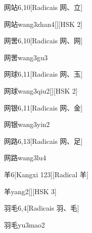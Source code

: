 \begin{entry}{网站}{6,10}[Radicais ⽹、⽴]
  \begin{phonetics}{网站}{wang3zhan4}[][HSK 2]
  \end{phonetics}
\end{entry}

\begin{entry}{网罟}{6,10}[Radicais ⽹、⽹]
  \begin{phonetics}{网罟}{wang3gu3}
  \end{phonetics}
\end{entry}

\begin{entry}{网球}{6,11}[Radicais ⽹、⽟]
  \begin{phonetics}{网球}{wang3qiu2}[][HSK 2]
  \end{phonetics}
\end{entry}

\begin{entry}{网银}{6,11}[Radicais ⽹、⾦]
  \begin{phonetics}{网银}{wang3yin2}
  \end{phonetics}
\end{entry}

\begin{entry}{网路}{6,13}[Radicais ⽹、⾜]
  \begin{phonetics}{网路}{wang3lu4}
  \end{phonetics}
\end{entry}

\begin{entry}{羊}{6}[Kangxi 123][Radical ⽺]
  \begin{phonetics}{羊}{yang2}[][HSK 3]
  \end{phonetics}
\end{entry}

\begin{entry}{羽毛}{6,4}[Radicais ⽻、⽑]
  \begin{phonetics}{羽毛}{yu3mao2}
  \end{phonetics}
\end{entry}

